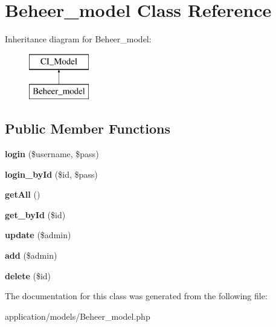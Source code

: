 \hypertarget{class_beheer__model}{}\section{Beheer\+\_\+model Class Reference}
\label{class_beheer__model}
Inheritance diagram for Beheer\+\_\+model\+:\begin{figure}[H]
\begin{center}
\leavevmode
\includegraphics[height=2.000000cm]{class_beheer__model}
\end{center}
\end{figure}
\subsection*{Public Member Functions}
\begin{DoxyCompactItemize}
\item 
\mbox{\label{class_beheer__model_aff0ccaed0f67602297ac11a535a53af9}} 
{\bfseries login} (\$username, \$pass)
\item 
\mbox{\label{class_beheer__model_ae1918ad227881de34ca871dca896a623}} 
{\bfseries login\+\_\+by\+Id} (\$id, \$pass)
\item 
\mbox{\label{class_beheer__model_aba0d5b303383fb5b1fabb5fd01cd3800}} 
{\bfseries get\+All} ()
\item 
\mbox{\label{class_beheer__model_a98d28a4d9a29d40c5a8aa0176f19a919}} 
{\bfseries get\+\_\+by\+Id} (\$id)
\item 
\mbox{\label{class_beheer__model_a9b26d258cdfbbf0025a56dbe2f0088b0}} 
{\bfseries update} (\$admin)
\item 
\mbox{\label{class_beheer__model_a9a6cdec5d258d2b51d1a7619909b2a90}} 
{\bfseries add} (\$admin)
\item 
\mbox{\label{class_beheer__model_a2f8258add505482d7f00ea26493a5723}} 
{\bfseries delete} (\$id)
\end{DoxyCompactItemize}


The documentation for this class was generated from the following file\+:\begin{DoxyCompactItemize}
\item 
application/models/Beheer\+\_\+model.\+php\end{DoxyCompactItemize}
